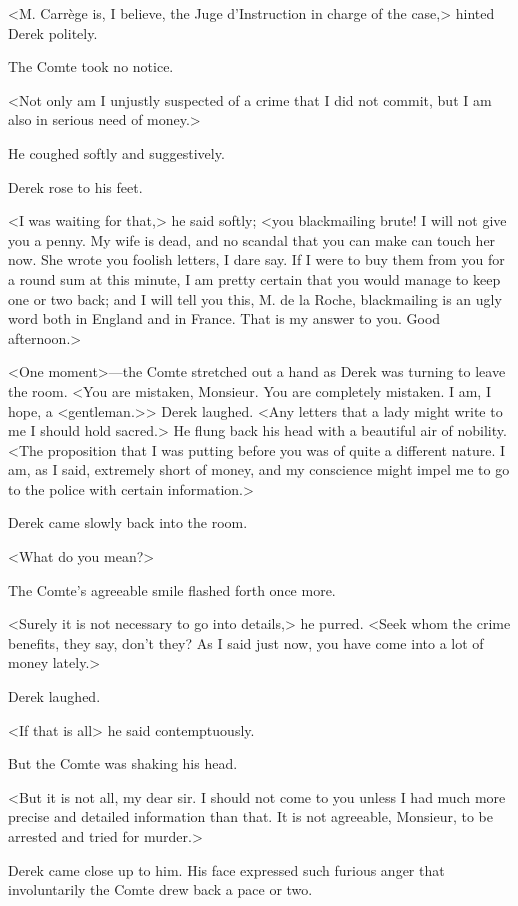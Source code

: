 <M. Carrège is, I believe, the Juge d'Instruction in charge of the case,> hinted Derek politely.

The Comte took no notice.

<Not only am I unjustly suspected of a crime that I did not commit, but I am also in serious need of money.>

He coughed softly and suggestively.

Derek rose to his feet.

<I was waiting for that,> he said softly; <you blackmailing brute! I will not give you a penny. My wife is dead, and no scandal that you can make can touch her now. She wrote you foolish letters, I dare say. If I were to buy them from you for a round sum at this minute, I am pretty certain that you would manage to keep one or two back; and I will tell you this, M. de la Roche, blackmailing is an ugly word both in England and in France. That is my answer to you. Good afternoon.>

<One moment>—the Comte stretched out a hand as Derek was turning to leave the room. <You are mistaken, Monsieur. You are completely mistaken. I am, I hope, a <gentleman.>> Derek laughed. <Any letters that a lady might write to me I should hold sacred.> He flung back his head with a beautiful air of nobility. <The proposition that I was putting before you was of quite a different nature. I am, as I said, extremely short of money, and my conscience might impel me to go to the police with certain information.>

Derek came slowly back into the room.

<What do you mean?>

The Comte's agreeable smile flashed forth once more.

<Surely it is not necessary to go into details,> he purred. <Seek whom the crime benefits, they say, don't they? As I said just now, you have come into a lot of money lately.>

Derek laughed.

<If that is all\longdash> he said contemptuously.

But the Comte was shaking his head.

<But it is not all, my dear sir. I should not come to you unless I had much more precise and detailed information than that. It is not agreeable, Monsieur, to be arrested and tried for murder.>

Derek came close up to him. His face expressed such furious anger that involuntarily the Comte drew back a pace or two.

